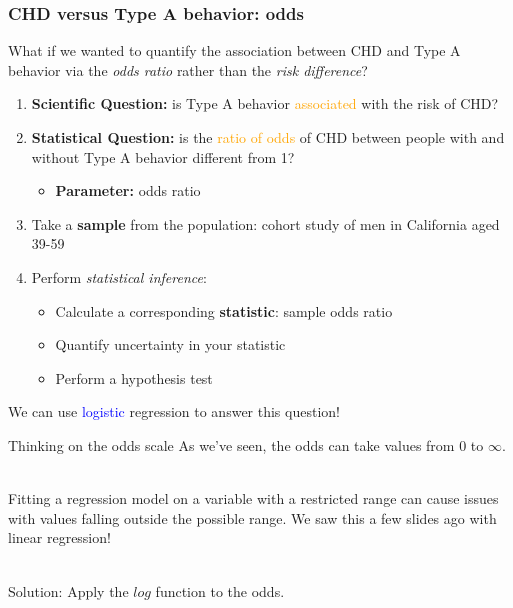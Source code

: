 \documentclass[10pt,t]{beamer}
\begin{document}
\begin{frame}
	\frametitle{CHD versus Type A behavior: odds}
	\vspace{-0.5cm}
	\begin{small} What if we wanted to quantify the association between CHD and Type A behavior via the \textit{odds ratio} rather than the \textit{risk difference}? \end{small} \pause

	\begin{enumerate}
			\item \textbf{Scientific Question:} is Type A behavior \textcolor{orange}{associated} with the risk of CHD? \pause
			\item \textbf{Statistical Question:} is the \textcolor{orange}{ratio of odds} of CHD between people with and without Type A behavior different from 1? \pause
			\begin{itemize}
					\item \textbf{Parameter:} odds ratio \pause
				\end{itemize}
			\item Take a \textbf{sample} from the population: cohort study of men in California aged 39-59 \pause
			\item Perform \textit{statistical inference}:
			\begin{itemize}
					\item Calculate a corresponding \textbf{statistic}: sample odds ratio
					\item Quantify uncertainty in your statistic
					\item Perform a hypothesis test \pause
				\end{itemize}
		\end{enumerate}
	
	\vspace{-0.2cm}
	We can use \textcolor{blue}{logistic} regression to answer this question!
\end{frame}

\begin{frame}{Thinking on the odds scale}
	As we've seen, the odds can take values from 0 to $\infty$. 
	\\ ~\
	
	Fitting a regression model on a variable with a restricted range can cause issues with values falling outside the possible range. We saw this a few slides ago with linear regression!
	\\ ~\
	
	Solution: Apply the $log$ function to the odds. 
\end{frame}
\end{document}
